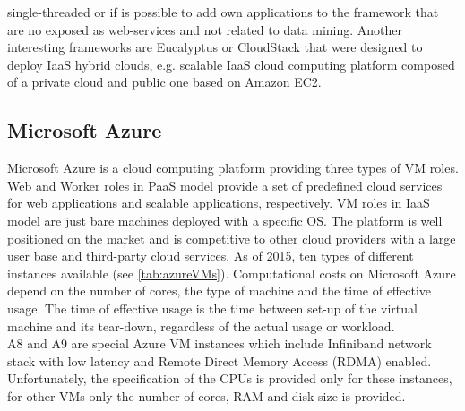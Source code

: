 \documentclass[3p,times]{elsarticle}
\begin{document}
\begin{description}
single-threaded or if is possible to add own applications to the framework that are no exposed as web-services and not related to data mining. 
Another interesting frameworks are Eucalyptus \cite{eucalyptus} or CloudStack \cite{CloudStack} that were designed to deploy IaaS hybrid clouds, e.g. scalable IaaS cloud computing platform composed of a private cloud and public one based on Amazon EC2.

\end{description}








\subsection{Microsoft Azure}

Microsoft Azure is a cloud computing platform providing three types of VM roles. Web and Worker roles in PaaS model provide a set of predefined cloud services for web applications and scalable applications, respectively. VM roles in IaaS model are just bare machines deployed with a specific OS. The platform is well positioned on the market and is competitive to other cloud providers \cite{cloudScores} \cite{twister4azure} with a large user base and third-party cloud services. As of 2015, ten types of different instances available (see \ref{tab:azureVMs}). Computational costs on Microsoft Azure depend on the number of cores, the type of machine and the time of effective usage. The time of effective usage is the time between set-up of the virtual machine and its tear-down, regardless of the actual usage or workload. \\
A8 and A9 are special Azure VM instances which include Infiniband network stack with low latency and Remote Direct Memory Access (RDMA) enabled. Unfortunately, the specification of the CPUs is provided only for these instances, for other VMs only the number of cores, RAM and disk size is provided. 
 
\end{document}
